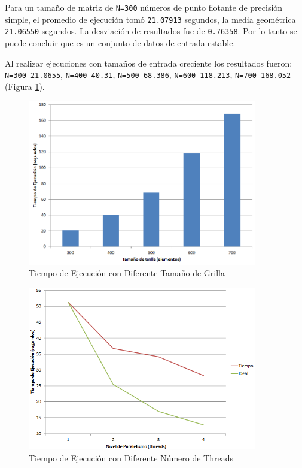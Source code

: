 \documentclass[a4paper]{report}
\begin{document}
Para un tamaño de matriz de {\tt N=300} números de punto flotante de precisión simple, el promedio de ejecución tomó {\tt 21.07913} segundos, la media geométrica {\tt 21.06550} segundos. La desviación de resultados fue de {\tt 0.76358}.
Por lo tanto se puede concluir que es un conjunto de datos de entrada estable.

\bigskip

Al realizar ejecuciones con tamaños de entrada creciente los resultados fueron:
{\tt N=300 21.0655}, {\tt N=400 40.31}, {\tt N=500 68.386}, {\tt N=600 118.213}, {\tt N=700 168.052} (Figura \ref{fig:heat-problem}).

\begin{figure}[H]
\centering
\includegraphics[width=10cm]{heat-problem.png}
\caption{Tiempo de Ejecución con Diferente Tamaño de Grilla}
\label{fig:heat-problem}
\end{figure}

\begin{figure}[H]
\centering
\includegraphics[width=10cm]{heat-threads.png}
\caption{Tiempo de Ejecución con Diferente Número de Threads}
\label{fig:heat-threads}
\end{figure}
\end{document}
